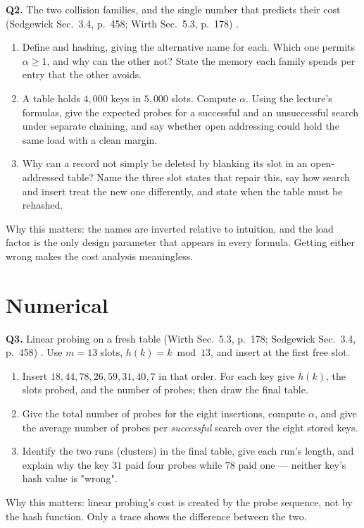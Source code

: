 \documentclass[11pt]{article}
\begin{document}
\textbf{Q2.} The two collision families, and the single number that predicts their cost (Sedgewick Sec.~3.4, p.~458; Wirth Sec.~5.3, p.~178) \cite{Sedgewick2011_algorithms,Wirth2004_algorithms_data_structures}.
\begin{enumerate}
  \item[(a)] Define  and  hashing, giving the alternative name for each. Which one permits $\alpha \ge 1$, and why can the other not? State the memory each family spends per entry that the other avoids.
  \item[(b)] A table holds $4{,}000$ keys in $5{,}000$ slots. Compute $\alpha$. Using the lecture's formulas, give the expected probes for a successful and an unsuccessful search under separate chaining, and say whether open addressing could hold the same load with a clean margin.
  \item[(c)] Why can a record not simply be deleted by blanking its slot in an open-addressed table? Name the three slot states that repair this, say how search and insert treat the new one differently, and state when the table must be rehashed.
\end{enumerate}
Why this matters: the names are inverted relative to intuition, and the load factor is the only design parameter that appears in every formula. Getting either wrong makes the cost analysis meaningless.

\section{Numerical}

\textbf{Q3.} Linear probing on a fresh table (Wirth Sec.~5.3, p.~178; Sedgewick Sec.~3.4, p.~458) \cite{Wirth2004_algorithms_data_structures,Sedgewick2011_algorithms}. Use $m = 13$ slots, $h(k) = k \bmod 13$, and insert at the first free slot.
\begin{enumerate}
  \item[(a)] Insert $18, 44, 78, 26, 59, 31, 40, 7$ in that order. For each key give $h(k)$, the slots probed, and the number of probes; then draw the final table.
  \item[(b)] Give the total number of probes for the eight insertions, compute $\alpha$, and give the average number of probes per \emph{successful} search over the eight stored keys.
  \item[(c)] Identify the two runs (clusters) in the final table, give each run's length, and explain why the key $31$ paid four probes while $78$ paid one --- neither key's hash value is "wrong".
\end{enumerate}
Why this matters: linear probing's cost is created by the probe sequence, not by the hash function. Only a trace shows the difference between the two.
\end{document}
